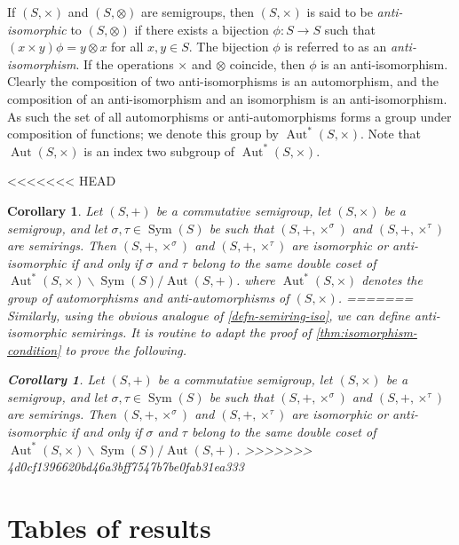 \documentclass{article}
\theoremstyle{definition}
\theoremstyle{plain}
\newtheorem{cor}[defn]{Corollary}
\newcommand{\Sym}{\operatorname{Sym}}
\newcommand{\Aut}{\operatorname{Aut}}
\begin{document}
If $(S, \times)$ and $(S, \otimes)$ are semigroups, then $(S, \times)$ is said
to be \textit{anti-isomorphic} to $(S, \otimes)$ if there exists a bijection
$\phi: S \to S$ such that $(x\times y)\phi = y\otimes x$ for all $x, y\in S$.
The bijection $\phi$ is referred to as an \textit{anti-isomorphism}. If the
operations $\times$ and $\otimes$ coincide, then $\phi$ is an anti-isomorphism.
Clearly the composition of two anti-isomorphisms is an automorphism, and the
composition of an anti-isomorphism and an isomorphism is an anti-isomorphism.
As such the set of all automorphisms or anti-automorphisms forms a group under
composition of functions; we denote this group by $\Aut^*(S, \times)$. Note
that $\Aut(S, \times)$ is an index two subgroup of $\Aut^*(S, \times)$.

<<<<<<< HEAD
\begin{cor}
  \label{cor:equiv-condition}
  Let \((S, +)\) be a commutative semigroup, let \((S, \times)\) be a semigroup,
  and let \(\sigma, \tau\in\Sym(S)\) be such that $(S, +, \times ^ \sigma)$ and
  $(S, +, \times ^ \tau)$ are semirings.
  Then \((S, +, \times ^ \sigma)\) and \((S, +, \times^\tau)\) are isomorphic or anti-isomorphic if and only if \(\sigma\) and \(\tau\) belong to the same double coset of \(\Aut^*(S, \times) \backslash \Sym(S) / \Aut(S, +)\).
  where \(\Aut^*(S, \times)\) denotes the group of
  automorphisms and anti-automorphisms of \((S, \times)\).
=======
Similarly, using the obvious analogue of \cref{defn-semiring-iso}, we can
define anti-isomorphic semirings. It is routine to adapt the proof of
\cref{thm:isomorphism-condition} to prove the following.

\begin{cor}
  \label{cor:equiv-condition}
  Let \((S, +)\) be a commutative semigroup, let \((S, \times)\) be a
  semigroup, and let \(\sigma, \tau\in\Sym(S)\) be such that $(S, +, \times ^
  \sigma)$ and $(S, +, \times ^ \tau)$ are semirings. Then \((S, +, \times ^
  \sigma)\) and \((S, +, \times^\tau)\) are isomorphic or anti-isomorphic if
  and only if \(\sigma\) and \(\tau\) belong to the same double coset of
  \(\Aut^*(S, \times) \backslash \Sym(S) / \Aut(S, +)\).
>>>>>>> 4d0cf1396620bd46a3bff7547b7be0fab31ea333
\end{cor}

\section{Tables of results}


\end{cor}
\end{document}
